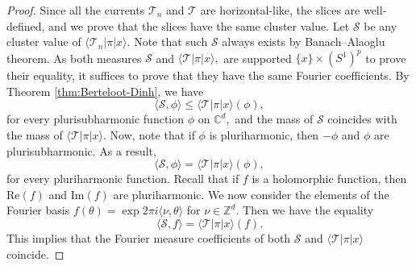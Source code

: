 \documentclass[11pt]{amsart}
\theoremstyle{definition}
\newcommand{\Z}{\mathbb{Z}}
\newcommand{\lto}{\longrightarrow}
\newcommand{\C}{\mathbb{C}}
\newcommand{\trop}{\mathrm{trop}}
\newcommand{\sT}{\mathscr{T}}
\newcommand{\sS}{\mathscr{S}}
\newcommand{\sW}{\mathscr{W}}
\begin{document}
\begin{proof} 
Since all the currents $\sT_n$ and $\sT$ are horizontal-like, the slices are well-defined, and we prove that the slices have the same cluster value. Let $\sS$ be any cluster value of $\langle \sT_n | \pi| x\rangle.$   Note that such $\sS$ always exists by Banach--Alaoglu  theorem. As both measures $\sS$ and $\langle \sT | \pi| x\rangle,$ are supported $\{x\}\times (S^1)^p$ to prove their equality, it suffices to prove that they have the same Fourier coefficients. By Theorem \ref{thm:Berteloot-Dinh}, we have 
   $$
    \langle \sS , \phi \rangle \leq  \langle \sT | \pi| x\rangle (\phi),
    $$
    for every plurisubharmonic function $\phi$ on $\C^d,$ and the mass of $\sS$ coincides with the mass of $\langle \sT | \pi| x\rangle.$ Now, note that if  $\phi$ is pluriharmonic, then $-\phi$ and $\phi$ are plurisubharmonic. As a result, 
    $$
    \langle \sS , \phi \rangle =  \langle \sT | \pi| x\rangle (\phi),
    $$
    for every pluriharmonic function. Recall that if $ f$ is a holomorphic function, then $\text{Re}(f)$ and $\text{Im}(f)$ are pluriharmonic. We now consider the elements of the Fourier basis $f(\theta)= \exp{2 \pi i \langle \nu , \theta \rangle }$ for $\nu \in \Z^d.$ Then we have the equality 
    $$
    \langle \sS , f \rangle =  \langle \sT | \pi| x\rangle (f).
    $$
This implies that the Fourier measure coefficients of both $\sS$ and $\langle \sT | \pi| x\rangle $ coincide. 
\end{proof}
\end{document}

